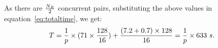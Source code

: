 \documentclass{rspublic}
\newcommand{\alnote}[1]{ {\textcolor{blue} { ***andre: #1 }}}
\newcommand{\athotanote}[1]{ {\textcolor{green} { ***athota: #1 }}}
\newcommand{\alnote}[1]{}
\newcommand{\athotanote}[1]{}
\begin{document}





As there are $N_R \over 2$ concurrent pairs, substituting the above
values in equation~\ref{eq:totaltime}, we get:
\begin{eqnarray}
T=  {1 \over p} \times {{(71\times {128\over 16}}) + {(7.2+0.7)\times 128\over 16}} = {1 \over p} \times 633~s.
\label{eq:decent}
\end{eqnarray}



\end{document}
